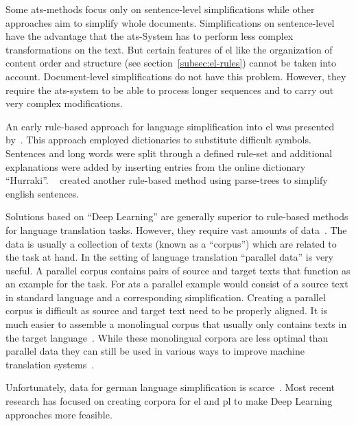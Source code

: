 Some \gls{ats}-methods focus only on sentence-level simplifications while other approaches aim to simplify whole documents.
Simplifications on sentence-level have the advantage that the \gls{ats}-System has to perform less complex transformations on the text.
But certain features of \gls{el} like the organization of content order and structure (see section~\ref{subsec:el-rules}) cannot be taken into account. %
Document-level simplifications do not have this problem.
However, they require the \gls{ats}-system to be able to process longer sequences and to carry out very complex modifications.

An early rule-based approach for language simplification into \gls{el} was presented by~\autocite{suter2016}.
This approach employed dictionaries to substitute difficult symbols.
Sentences and long words were split through a defined rule-set and additional explanations were added by inserting entries from the online dictionary \enquote{Hurraki}.
~\autocite{Garain2019} created another rule-based method using parse-trees to simplify english sentences.

Solutions based on \enquote{Deep Learning} are generally superior to rule-based methods for language translation tasks.
However, they require vast amounts of data~\autocite{otter2019survey}.
The data is usually a collection of texts (known as a \enquote{corpus}) which are related to the task at hand.
In the setting of language translation \enquote{parallel data} is very useful.
A parallel corpus contains pairs of source and target texts that function as an example for the task.
For \gls{ats} a parallel example would consist of a source text in standard language and a corresponding simplification.
Creating a parallel corpus is difficult as source and target text need to be properly aligned.
It is much easier to assemble a monolingual corpus that usually only contains texts in the target language~\autocite{chan2023routledge}.
While these monolingual corpora are less optimal than parallel data they can still be used in various ways to improve machine translation systems~\autocite{lample2018unsupervised, burlot2019using, chan2023routledge}.

Unfortunately, data for german language simplification is scarce~\autocite{Ansch_tz_2023}.
Most recent research has focused on creating corpora for \gls{el} and \gls{pl} to make Deep Learning approaches more feasible.

